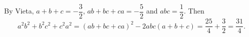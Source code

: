 By Vieta, $a+b+c=-\dfrac32$, $ab+bc+ca=-\dfrac52$ and $abc=\dfrac12$. Then
\[a^2b^2+b^2c^2+c^2a^2=(ab+bc+ca)^2-2abc(a+b+c)=\dfrac{25}4+\dfrac32=\boxed{\dfrac{31}4}.\]
